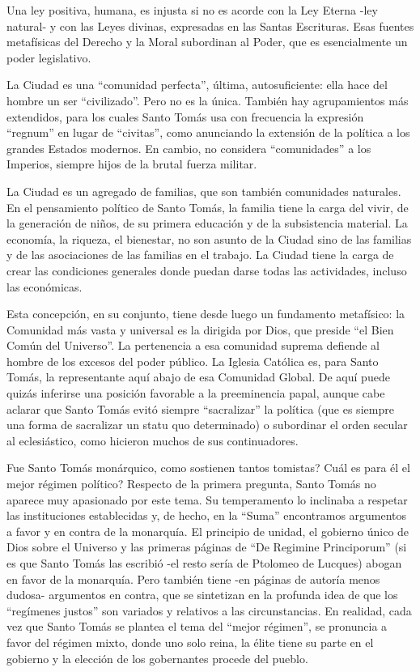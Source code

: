 \documentclass[
]{book}
\begin{document}
Una ley positiva, humana, es injusta si no es acorde con la Ley Eterna -ley natural- y con las Leyes divinas, expresadas en las Santas Escrituras. Esas fuentes metafísicas del Derecho y la Moral subordinan al Poder, que es esencialmente un poder legislativo.

La Ciudad es una ``comunidad perfecta'', última, autosuficiente: ella hace del hombre un ser ``civilizado''. Pero no es la única. También hay agrupamientos más extendidos, para los cuales Santo Tomás usa con frecuencia la expresión ``regnum'' en lugar de ``civitas'', como anunciando la extensión de la política a los grandes Estados modernos. En cambio, no considera ``comunidades'' a los Imperios, siempre hijos de la brutal fuerza militar.

La Ciudad es un agregado de familias, que son también comunidades naturales. En el pensamiento político de Santo Tomás, la familia tiene la carga del vivir, de la generación de niños, de su primera educación y de la subsistencia material. La economía, la riqueza, el bienestar, no son asunto de la Ciudad sino de las familias y de las asociaciones de las familias en el trabajo. La Ciudad tiene la carga de crear las condiciones generales donde puedan darse todas las actividades, incluso las económicas.

Esta concepción, en su conjunto, tiene desde luego un fundamento metafísico: la Comunidad más vasta y universal es la dirigida por Dios, que preside ``el Bien Común del Universo''. La pertenencia a esa comunidad suprema defiende al hombre de los excesos del poder público. La Iglesia Católica es, para Santo Tomás, la representante aquí abajo de esa Comunidad Global. De aquí puede quizás inferirse una posición favorable a la preeminencia papal, aunque cabe aclarar que Santo Tomás evitó siempre ``sacralizar'' la política (que es siempre una forma de sacralizar un statu quo determinado) o subordinar el orden secular al eclesiástico, como hicieron muchos de sus continuadores.

Fue Santo Tomás monárquico, como sostienen tantos tomistas? Cuál es para él el mejor régimen político? Respecto de la primera pregunta, Santo Tomás no aparece muy apasionado por este tema. Su temperamento lo inclinaba a respetar las instituciones establecidas y, de hecho, en la ``Suma'' encontramos argumentos a favor y en contra de la monarquía. El principio de unidad, el gobierno único de Dios sobre el Universo y las primeras páginas de ``De Regimine Principorum'' (si es que Santo Tomás las escribió -el resto sería de Ptolomeo de Lucques) abogan en favor de la monarquía. Pero también tiene -en páginas de autoría menos dudosa- argumentos en contra, que se sintetizan en la profunda idea de que los ``regímenes justos'' son variados y relativos a las circunstancias. En realidad, cada vez que Santo Tomás se plantea el tema del ``mejor régimen'', se pronuncia a favor del régimen mixto, donde uno solo reina, la élite tiene su parte en el gobierno y la elección de los gobernantes procede del pueblo.
\end{document}
